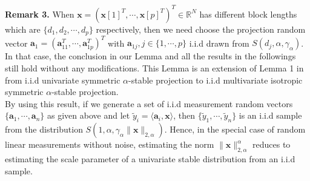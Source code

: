 \documentclass[journal,onecolumn]{IEEEtran}
\begin{document}
\noindent
{\bf Remark 3.} When $\mathbf{x}=(\mathbf{x}[1]^T,\cdots,\mathbf{x}[p]^T)^T\in\mathbb{R}^N$ has different block lengths which are $\{d_1,d_2,\cdots,d_p\}$ respectively, then we need choose the projection random vector $\mathbf{a}_1=(\mathbf{a}_{11}^T,\cdots,\mathbf{a}_{1p}^T)^T$ with $\mathbf{a}_{1j}, j\in\{1,\cdots,p\}$ i.i.d drawn from $S(d_j,\alpha,\gamma_\alpha)$. In that case, the conclusion in our Lemma and all the results in the followings still hold without any modifications. This Lemma is an extension of Lemma 1 in \cite{l2} from i.i.d univariate symmetric $\alpha$-stable projection to i.i.d multivariate isotropic symmetric $\alpha$-stable projection. \\

By using this result, if we generate a set of i.i.d measurement random vectors $\{\mathbf{a}_1,\cdots,\mathbf{a}_n\}$ as given above and let $\tilde{y}_i=\langle\mathbf{a}_i,\mathbf{x}\rangle$, then $\{\tilde{y}_1,\cdots,\tilde{y}_n\}$ is an i.i.d sample from the distribution $S(1,\alpha,\gamma_\alpha\lVert\mathbf{x}\rVert_{2,\alpha})$. Hence, in the special case of random linear measurements without noise, estimating the norm $\lVert\mathbf{x}\rVert_{2,\alpha}^{\alpha}$ reduces to estimating the scale parameter of a univariate stable distribution from an i.i.d sample.\\
\end{document}
